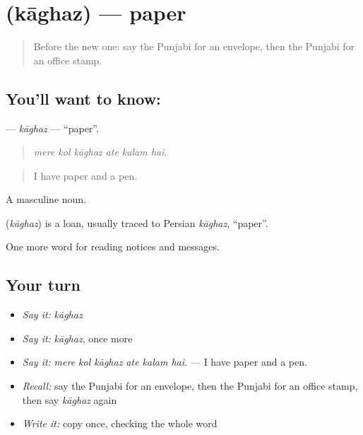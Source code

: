 \section[\texorpdfstring{\pa{ਕਾਗ਼ਜ਼} (kāghaz)}{ਕਾਗ਼ਜ਼ (kāghaz)}]{ (kāghaz) — paper}

\label{lesson:PA-C255-kaghaz}



\begin{quote}
Before the new one: say the Punjabi for an envelope, then the Punjabi for an office stamp.
\end{quote}

\subsection*{You'll want to know: }
\textbf{} — \emph{kāghaz} — \textquotedblleft{}paper\textquotedblright{}.

\begin{quote}
     
\end{quote}

\begin{quote}
\emph{mere kol kāghaz ate kalam hai.}
\end{quote}

\begin{quote}
I have paper and a pen.
\end{quote}

A masculine noun.

\begin{cousinweb}
\textbf{} (\emph{kāghaz}) is a loan, usually traced to Persian \emph{kāghaz}, \textquotedblleft{}paper\textquotedblright{}.
\end{cousinweb}

\begin{grammarlens}[title={What you've built}]
One more word for reading notices and messages.
\end{grammarlens}

\subsection*{Your turn}
\begin{itemize}
\raggedright
  \item \emph{Say it:} \emph{kāghaz}
  \item \emph{Say it:} \emph{kāghaz}, once more
  \item \emph{Say it:} \emph{mere kol kāghaz ate kalam hai.} — I have paper and a pen.
  \item \emph{Recall:} say the Punjabi for an envelope, then the Punjabi for an office stamp, then say \emph{kāghaz} again
  \item \emph{Write it:} copy \textbf{} once, checking the whole word
\end{itemize}

